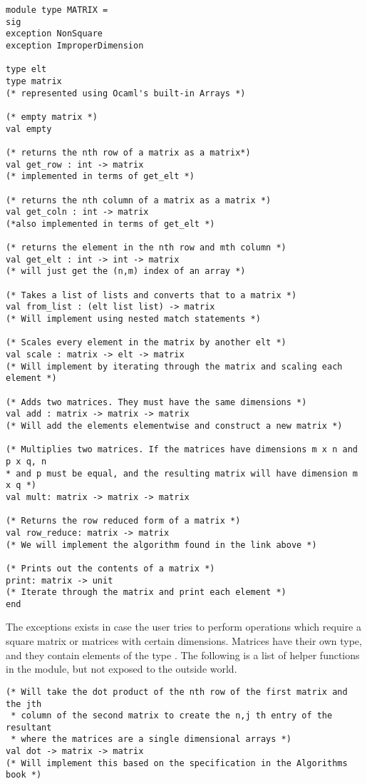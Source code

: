 \documentclass[letterpaper,11pt]{article}
\begin{document}
\begin{verbatim}
module type MATRIX =
sig
exception NonSquare
exception ImproperDimension

type elt
type matrix
(* represented using Ocaml's built-in Arrays *)

(* empty matrix *)
val empty

(* returns the nth row of a matrix as a matrix*)
val get_row : int -> matrix
(* implemented in terms of get_elt *)

(* returns the nth column of a matrix as a matrix *)
val get_coln : int -> matrix
(*also implemented in terms of get_elt *)

(* returns the element in the nth row and mth column *)
val get_elt : int -> int -> matrix 
(* will just get the (n,m) index of an array *)

(* Takes a list of lists and converts that to a matrix *)
val from_list : (elt list list) -> matrix
(* Will implement using nested match statements *)

(* Scales every element in the matrix by another elt *)
val scale : matrix -> elt -> matrix
(* Will implement by iterating through the matrix and scaling each element *)

(* Adds two matrices. They must have the same dimensions *)
val add : matrix -> matrix -> matrix
(* Will add the elements elementwise and construct a new matrix *)

(* Multiplies two matrices. If the matrices have dimensions m x n and p x q, n
* and p must be equal, and the resulting matrix will have dimension m x q *)
val mult: matrix -> matrix -> matrix

(* Returns the row reduced form of a matrix *)
val row_reduce: matrix -> matrix
(* We will implement the algorithm found in the link above *)

(* Prints out the contents of a matrix *)
print: matrix -> unit
(* Iterate through the matrix and print each element *)
end
\end{verbatim}

The exceptions exists in case the user tries to perform operations which require
a square matrix or matrices with certain dimensions. Matrices have their own
type, and they contain elements of the type \verb@elt@. The following is a list
of helper functions in the module, but not exposed to the outside world.

\begin{verbatim}
(* Will take the dot product of the nth row of the first matrix and the jth
 * column of the second matrix to create the n,j th entry of the resultant 
 * where the matrices are a single dimensional arrays *)
val dot -> matrix -> matrix
(* Will implement this based on the specification in the Algorithms book *)
\end{verbatim}
\end{document}
